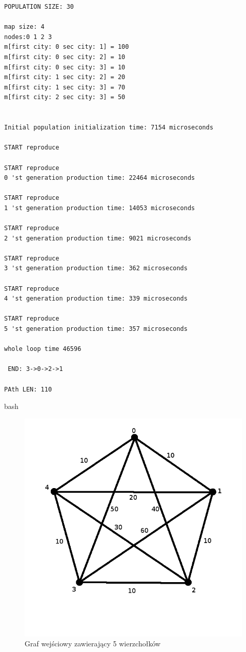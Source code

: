 \documentclass[10pt,a4paper]{article}
\begin{document}
\begin{verbatim}
POPULATION SIZE: 30

map size: 4
nodes:0 1 2 3 
m[first city: 0 sec city: 1] = 100
m[first city: 0 sec city: 2] = 10
m[first city: 0 sec city: 3] = 10
m[first city: 1 sec city: 2] = 20
m[first city: 1 sec city: 3] = 70
m[first city: 2 sec city: 3] = 50


Initial population initialization time: 7154 microseconds

START reproduce

START reproduce
0 'st generation production time: 22464 microseconds

START reproduce
1 'st generation production time: 14053 microseconds

START reproduce
2 'st generation production time: 9021 microseconds

START reproduce
3 'st generation production time: 362 microseconds

START reproduce
4 'st generation production time: 339 microseconds

START reproduce
5 'st generation production time: 357 microseconds

whole loop time 46596

 END: 3->0->2->1

PAth LEN: 110
\end{verbatim}{bash}

\begin{figure}[H]
\includegraphics[scale=0.5]{mapa5.png}
\centering
\caption{\label{graph5}Graf wejściowy zawierający 5 wierzchołków}
\end{figure}
\end{document}
